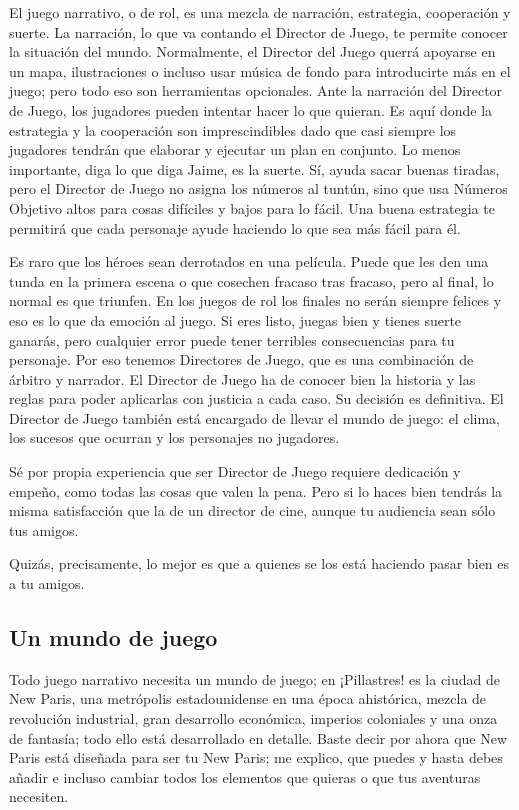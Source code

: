 El juego narrativo, o de rol, es una mezcla de narración, estrategia, cooperación y suerte. La narración, lo que va contando el Director de Juego, te permite conocer la situación del mundo. Normalmente, el Director del Juego querrá apoyarse en un mapa, ilustraciones o incluso usar música de fondo para introducirte más en el juego; pero todo eso son herramientas opcionales. Ante la narración del Director de Juego, los jugadores pueden intentar hacer lo que quieran. Es aquí donde la estrategia y la cooperación son imprescindibles dado que casi siempre los jugadores tendrán que elaborar y ejecutar un plan en conjunto. Lo menos importante, diga lo que diga Jaime, es la suerte. Sí, ayuda sacar buenas tiradas, pero el Director de Juego no asigna los números al tuntún, sino que usa Números Objetivo altos para cosas difíciles y bajos para lo fácil. Una buena estrategia te permitirá que cada personaje ayude haciendo lo que sea más fácil para él.

Es raro que los héroes sean derrotados en una película. Puede que les den una tunda en la primera escena o que cosechen fracaso tras fracaso, pero al final, lo normal es que triunfen. En los juegos de rol los finales no serán siempre felices y eso es lo que da emoción al juego. Si eres listo, juegas bien y tienes suerte ganarás, pero cualquier error puede tener terribles consecuencias para tu personaje.
Por eso tenemos Directores de Juego, que es una combinación de árbitro y narrador. El Director de Juego ha de conocer bien la historia y las reglas para poder aplicarlas con justicia a cada caso. Su decisión es definitiva. El Director de Juego también está encargado de llevar el mundo de juego: el clima, los sucesos que ocurran y los personajes no jugadores.

Sé por propia experiencia que ser Director de Juego requiere dedicación y empeño, como todas las cosas que valen la pena. Pero si lo haces bien tendrás la misma satisfacción que la de un director de cine, aunque tu audiencia sean sólo tus amigos.

Quizás, precisamente, lo mejor es que a quienes se los está haciendo pasar bien es a tu amigos.

\subsection{Un mundo de juego}%

Todo juego narrativo necesita un mundo de juego; en ¡Pillastres! es la ciudad de New Paris, una metrópolis estadounidense en una época ahistórica, mezcla de revolución industrial, gran desarrollo económica, imperios coloniales y una onza de fantasía; todo ello está desarrollado en detalle. Baste decir por ahora que New Paris está diseñada para ser tu New Paris; me explico, que puedes y hasta debes añadir e incluso cambiar todos los elementos que quieras o que tus aventuras necesiten.

